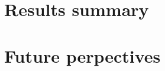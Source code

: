 \documentclass{article}
\begin{document}

\section{Results summary}


\section{Future perpectives}

\end{document}
